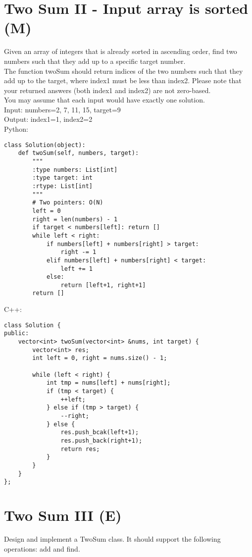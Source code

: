 \section{Two Sum II - Input array is sorted (M)}
Given an array of integers that is already sorted in ascending order, find two numbers such that they add up to a specific target number.\\

The function twoSum should return indices of the two numbers such that they add up to the target, where index1 must be less than index2. Please note that your returned answers (both index1 and index2) are not zero-based.\\

You may assume that each input would have exactly one solution.\\

Input: numbers={2, 7, 11, 15}, target=9\\
Output: index1=1, index2=2\\

Python:
\lstset{language=python}
\begin{lstlisting}
class Solution(object):
    def twoSum(self, numbers, target):
        """
        :type numbers: List[int]
        :type target: int
        :rtype: List[int]
        """
        # Two pointers: O(N)
        left = 0
        right = len(numbers) - 1
        if target < numbers[left]: return []
        while left < right:
            if numbers[left] + numbers[right] > target:
                right -= 1
            elif numbers[left] + numbers[right] < target:
                left += 1
            else:
                return [left+1, right+1]
        return []
   \end{lstlisting}         

C++:
\lstset{language=C++}
\begin{lstlisting}
class Solution {
public:
    vector<int> twoSum(vector<int> &nums, int target) {
        vector<int> res;
        int left = 0, right = nums.size() - 1;
        
        while (left < right) {
            int tmp = nums[left] + nums[right];
            if (tmp < target) {
                ++left;
            } else if (tmp > target) {
                --right;
            } else {
                res.push_bcak(left+1);
                res.push_back(right+1);
                return res;
            }
        }
    }
};
\end{lstlisting}


\section{Two Sum III (E)}
Design and implement a TwoSum class. It should support the following operations: add and find.\\

